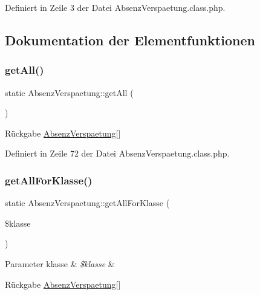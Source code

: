 Definiert in Zeile 3 der Datei Absenz\+Verspaetung.\+class.\+php.



\subsection{Dokumentation der Elementfunktionen}
\mbox{\label{class_absenz_verspaetung_a4e6707060da5ab5f251eeb1442549504}} 
\subsubsection{\texorpdfstring{get\+All()}{getAll()}}
{\footnotesize\ttfamily static Absenz\+Verspaetung\+::get\+All (\begin{DoxyParamCaption}{ }\end{DoxyParamCaption})\hspace{0.3cm}{\ttfamily [static]}}

\begin{DoxyReturn}{Rückgabe}
\mbox{\hyperlink{class_absenz_verspaetung}{Absenz\+Verspaetung}}\mbox{[}\mbox{]} 
\end{DoxyReturn}


Definiert in Zeile 72 der Datei Absenz\+Verspaetung.\+class.\+php.

\mbox{\label{class_absenz_verspaetung_a331e406cd5dd43766e1bdff887e685f7}} 
\subsubsection{\texorpdfstring{get\+All\+For\+Klasse()}{getAllForKlasse()}}
{\footnotesize\ttfamily static Absenz\+Verspaetung\+::get\+All\+For\+Klasse (\begin{DoxyParamCaption}\item[{}]{\$klasse }\end{DoxyParamCaption})\hspace{0.3cm}{\ttfamily [static]}}


\begin{DoxyParams}[1]{Parameter}
klasse & {\em \$klasse} & \\
\hline
\end{DoxyParams}
\begin{DoxyReturn}{Rückgabe}
\mbox{\hyperlink{class_absenz_verspaetung}{Absenz\+Verspaetung}}\mbox{[}\mbox{]} 
\end{DoxyReturn}


